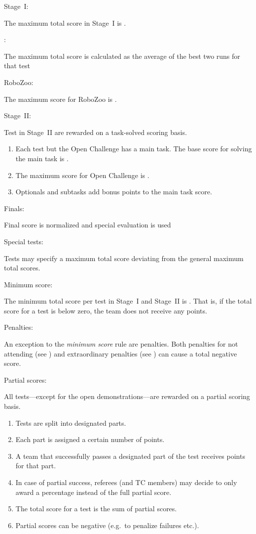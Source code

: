 \begin{enumerate}
  {\bf\item Stage~I:} The maximum total score in Stage~I is .
  \begin{enumerate}
    {\bf\item {}:} The maximum total score is calculated as the average of the best two runs for that test
    {\bf\item RoboZoo:} The maximum score for RoboZoo is .
  \end{enumerate}
  
  {\bf\item Stage~II:} Test in Stage~II are rewarded on a task-solved scoring basis.
  \begin{enumerate}
  \item Each test but the Open Challenge has a main task. The base score for solving the main task is .
  \item The maximum score for Open Challenge is .
  \item Optionals and subtasks add bonus points to the main task score.
  \end{enumerate}

  {\bf\item Finals:} Final score is normalized and special evaluation is used

  {\bf\item Special tests:} Tests may specify a maximum total score deviating from the general maximum total scores.
  {\bf\item Minimum score:} The minimum total score per test in Stage~I and Stage~II is . That is, if the total score for a test is below zero, the team does not receive any points.
  {\bf\item Penalties:} An exception to the \emph{minimum score} rule are penalties. Both penalties for not attending (see ) and extraordinary penalties (see ) can cause a total negative score. 
  {\bf\item Partial scores:} All tests---except for the open demonstrations---are rewarded on a partial scoring basis. 
  \begin{enumerate}
  \item Tests are split into designated parts.
  \item Each part is assigned a certain number of points.
  \item A team that successfully passes a designated part of the test receives points for that part.
  \item In case of partial success, referees (and TC members) may decide to only award a percentage instead of the full partial score.  
  \item The total score for a test is the sum of partial scores.
  \item Partial scores can be negative (e.g.~to penalize failures etc.).
  \end{enumerate}
\end{enumerate}


